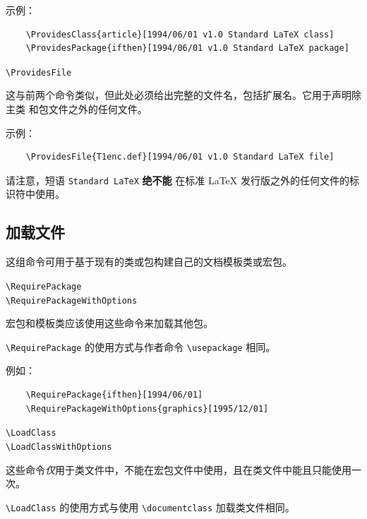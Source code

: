\documentclass{ltxguide}[1995/11/28]
\begin{document}
示例：
\begin{verbatim}
	\ProvidesClass{article}[1994/06/01 v1.0 Standard LaTeX class]
	\ProvidesPackage{ifthen}[1994/06/01 v1.0 Standard LaTeX package]
\end{verbatim}

\begin{decl}
	\verb|\ProvidesFile|  
\end{decl}
这与前两个命令类似，但此处必须给出完整的文件名，包括扩展名。它用于声明除主类
和包文件之外的任何文件。

示例：
\begin{verbatim}
	\ProvidesFile{T1enc.def}[1994/06/01 v1.0 Standard LaTeX file]
\end{verbatim}

请注意，短语 \texttt{Standard LaTeX} \textbf{绝不能} 在标准
\LaTeX{} 发行版之外的任何文件的标识符中使用。

\subsection{加载文件}
\label{Sec:loadf}

这组命令可用于基于现有的类或包构建自己的文档模板类或宏包。
\begin{decl}
	\verb|\RequirePackage|  
		\\
	\verb|\RequirePackageWithOptions| 
\end{decl}
宏包和模板类应该使用这些命令来加载其他包。

\verb|\RequirePackage| 的使用方式与作者命令 \verb|\usepackage| 相同。

例如：
\begin{verbatim}
	\RequirePackage{ifthen}[1994/06/01]
	\RequirePackageWithOptions{graphics}[1995/12/01]
\end{verbatim}

\begin{decl}
	\verb|\LoadClass|  
		\\
  \verb|\LoadClassWithOptions| 
\end{decl}
这些命令\emph{仅}用于类文件中，不能在宏包文件中使用，且在类文件中能且只能使用一次。

\verb|\LoadClass| 的使用方式与使用 \verb|\documentclass| 加载类文件相同。
\end{document}
